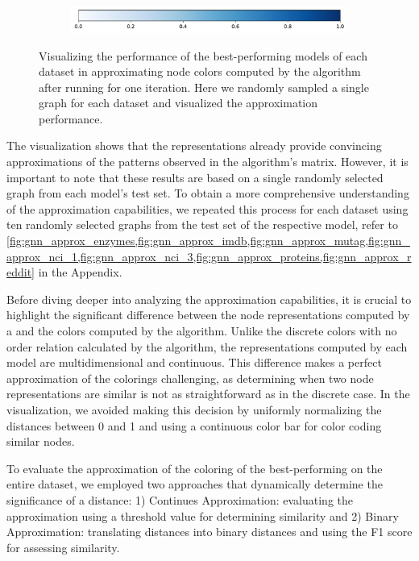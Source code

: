 \begin{figure}[!tbh]
\begin{subfigure}[b]{0.49\textwidth}
		\vspace*{-5ex}
        \caption{\reddit}
	\end{subfigure}
	\par\bigskip
	\begin{subfigure}[t]{0.6\textwidth}
		\centering
		\includegraphics[width=\textwidth]{Figures/colorbar.pdf}
	\end{subfigure}
	\caption{Visualizing the performance of the best-performing \gnn models of each dataset in approximating node colors computed by the \wl algorithm after running for one iteration. Here we randomly sampled a single graph for each dataset and visualized the approximation performance.}
	\label{fig:gnn_approx}
\end{figure}

The visualization shows that the \gnn representations already provide convincing approximations of the patterns observed in the \wl algorithm's matrix. However, it is important to note that these results are based on a single randomly selected graph from each model's test set. To obtain a more comprehensive understanding of the approximation capabilities, we repeated this process for each dataset using ten randomly selected graphs from the test set of the respective \gnn model, refer to \cref{fig:gnn_approx_enzymes,fig:gnn_approx_imdb,fig:gnn_approx_mutag,fig:gnn_approx_nci_1,fig:gnn_approx_nci_3,fig:gnn_approx_proteins,fig:gnn_approx_reddit} in the Appendix.

Before diving deeper into analyzing the approximation capabilities, it is crucial to highlight the significant difference between the node representations computed by a \gnn and the colors computed by the \wl algorithm. Unlike the discrete colors with no order relation calculated by the \wl algorithm, the representations computed by each \gnn model are multidimensional and continuous. This difference makes a perfect approximation of the \wl colorings challenging, as determining when two node representations are similar is not as straightforward as in the discrete \wl case. In the visualization, we avoided making this decision by uniformly normalizing the distances between 0 and 1 and using a continuous color bar for color coding similar nodes. 

To evaluate the approximation of the \wl coloring of the best-performing \gnn on the entire dataset, we employed two approaches that dynamically determine the significance of a distance: 1) Continues Approximation: evaluating the approximation using a threshold value for determining similarity and 2) Binary Approximation: translating distances into binary distances and using the F1 score for assessing similarity.

